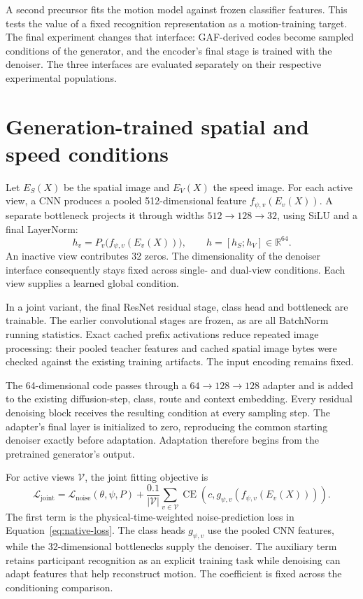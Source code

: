A second precursor fits the motion model against frozen classifier features. This tests the value of a fixed recognition representation as a motion-training target. The final experiment changes that interface: GAF-derived codes become sampled conditions of the generator, and the encoder's final stage is trained with the denoiser. The three interfaces are evaluated separately on their respective experimental populations.

\section{Generation-trained spatial and speed conditions}
Let $E_S(X)$ be the spatial image and $E_V(X)$ the speed image. For each active view, a CNN produces a pooled 512-dimensional feature $f_{\psi,v}(E_v(X))$. A separate bottleneck projects it through widths $512\rightarrow128\rightarrow32$, using SiLU and a final LayerNorm:
\begin{equation}
 h_v=P_v\bigl(f_{\psi,v}(E_v(X))\bigr),\qquad
 h=[h_S;h_V]\in\mathbb R^{64}.
 \label{eq:g40-code}
\end{equation}
An inactive view contributes 32 zeros. The dimensionality of the denoiser interface consequently stays fixed across single- and dual-view conditions. Each view supplies a learned global condition.

In a joint variant, the final ResNet residual stage, class head and bottleneck are trainable. The earlier convolutional stages are frozen, as are all BatchNorm running statistics. Exact cached prefix activations reduce repeated image processing: their pooled teacher features and cached spatial image bytes were checked against the existing training artifacts. The input encoding remains fixed.

The 64-dimensional code passes through a $64\rightarrow128\rightarrow128$ adapter and is added to the existing diffusion-step, class, route and context embedding. Every residual denoising block receives the resulting condition at every sampling step. The adapter's final layer is initialized to zero, reproducing the common starting denoiser exactly before adaptation. Adaptation therefore begins from the pretrained generator’s output.

For active views $\mathcal V$, the joint fitting objective is
\begin{equation}
 \mathcal L_{\mathrm{joint}}=
 \mathcal L_{\mathrm{noise}}(\theta,\psi,P)
 +\frac{0.1}{|\mathcal V|}\sum_{v\in\mathcal V}
 \operatorname{CE}\!\left(c,
 g_{\psi,v}(f_{\psi,v}(E_v(X)))\right).
 \label{eq:g40-joint}
\end{equation}
The first term is the physical-time-weighted noise-prediction loss in Equation~\ref{eq:native-loss}. The class heads $g_{\psi,v}$ use the pooled CNN features, while the 32-dimensional bottlenecks supply the denoiser. The auxiliary term retains participant recognition as an explicit training task while denoising can adapt features that help reconstruct motion. The coefficient is fixed across the conditioning comparison.

